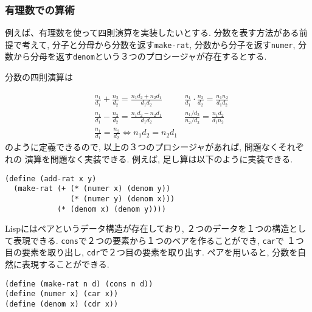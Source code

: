 \subsubsection{有理数での算術}
例えば、有理数を使って四則演算を実装したいとする. 分数を表す方法がある前提で考えて,
分子と分母から分数を返す\lstinline{make-rat}, 分数から分子を返す\lstinline{numer},
分数から分母を返す\lstinline{denom}という３つのプロシージャが存在するとする.

分数の四則演算は

\begin{align*}
  &\frac{n_1}{d_1} + \frac{n_2}{d_2}  = \frac{n_1d_2 + n_2d_1}{d_1d_2}
  & \frac{n_1}{d_1}\cdot \frac{n_2}{d_2} = \frac{n_1n_2}{d_1d_2}\\
  &\frac{n_1}{d_1} - \frac{n_2}{d_2} = \frac{n_1d_2 - n_2d_1}{d_1d_2}
  & \frac{n_1/d_2}{n_2/d_2} = \frac{n_1d_2}{d_1n_2}\\
  &\frac{n_1}{d_1} = \frac{n_2}{d_2} \Leftrightarrow n_1d_2 = n_2d_1
\end{align*}
\noindent
のように定義できるので, 以上の３つのプロシージャがあれば, 問題なくそれぞれの
演算を問題なく実装できる. 例えば, 足し算は以下のように実装できる.

\begin{lstlisting}[basicstyle=\footnotesize,title=分数の足し算]
(define (add-rat x y)
  (make-rat (+ (* (numer x) (denom y))
               (* (numer y) (denom x)))
            (* (denom x) (denom y))))
\end{lstlisting}
\vspace{5mm}

Lispにはペアというデータ構造が存在しており, ２つのデータを１つの構造として表現できる.
\lstinline{cons}で２つの要素から１つのペアを作ることができ, \lstinline{car}で
１つ目の要素を取り出し, \lstinline{cdr}で２つ目の要素を取り出す.
ペアを用いると, 分数を自然に表現することができる.

\begin{lstlisting}[basicstyle=\footnotesize,title=分数の表現]
(define (make-rat n d) (cons n d))
(define (numer x) (car x))
(define (denom x) (cdr x))
\end{lstlisting}
